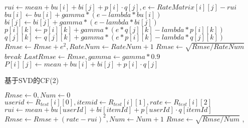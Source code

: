\documentclass[bachelor]{seuthesis} %
\begin{document}
\begin{Main}
\begin{algorithm}
\begin{algorithmic}[1]
                    \State $rui\gets mean+bu[i]+bi[j]+p[i]\cdot q[j],e\gets RateMatrix[i][j]-rui$
                    \State $bu[i]\gets bu[i]+gamma*(e-lambda*bu[i])$
                    \State $bi[j]\gets bi[j]+gamma*(e-lambda*bi[j])$
                        \State $p[i][k]\gets p[i][k]+gamma*(e*q[j][k]-lambda*p[i][k])$
                        \State $q[j][k]\gets q[j][k]+gamma*(e*p[i][k]-lambda*q[j][k])$
                    \EndFor 
                    \State $Rmse\gets Rmse+e^2,RateNum\gets RateNum+1$
                \EndFor
            \EndFor
            \State $Rmse\gets\sqrt{Rmse/RateNum}$
                \State $break$
            \EndIf
            \State $LastRmse\gets Rmse,gamma\gets gamma*0.9$
        \EndFor
                    \State $P[i][j]\gets mean+bu[i]+bi[j]+p[i]\cdot q[j]$
                \EndFor
        \EndFor  
        \State {}
        \EndFunction
    \end{algorithmic}
\end{algorithm}
\newpage
\begin{algorithm}
    \caption{基于SVD的CF(2)}
    \begin{algorithmic}[1] %
        \State $Rmse\gets0,Num\gets0$
            \State $userid\gets R_{test}[i][0],itemid\gets R_{test}[i][1],rate\gets R_{test}[i][2]$
            \State $rui\gets mean+bu[userId]+bi[itemId]+p[userId]\cdot q[itemId]$
            \State $Rmse\gets Rmse+(rate-rui)^2,Num\gets Num+1$
        \EndFor
        \State $Rmse\gets\sqrt{Rmse/Num}$
        \State {}
        \EndFunction
        \State {}
        \State {},
        \EndFunction
    \end{algorithmic}
\end{algorithm}

\end{Main}
\end{document}
